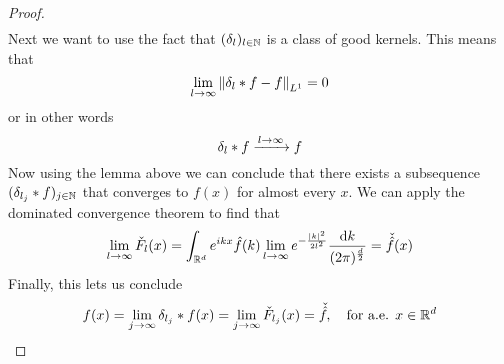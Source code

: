 \documentclass[../../script.tex]{subfiles}
\begin{document}
\begin{proof}
\begin{equation}
\begin{split}
        \end{split}
    \end{equation}
    Next we want to use the fact that $(\delta_l)_{l \in \mathbb{N}}$ is a class of good kernels. This means that 
    \begin{equation}
        \lim_{l \rightarrow \infty} \norm{\delta_l * f - f}_{L^1} = 0
    \end{equation}
    or in other words 
    \begin{equation}
        \delta_l * f \conv{l \rightarrow \infty} f
    \end{equation}
    Now using the lemma above we can conclude that there exists a subsequence $(\delta_{l_j} * f)_{j \in \mathbb{N}}$ that converges to $f(x)$ for almost every $x$.
    We can apply the dominated convergence theorem to find that 
    \begin{equation}
        \lim_{l \rightarrow \infty} \check{F}_l(x) = \int_{\mathbb{R}^d} e^{ikx} \hat{f}(k) \lim_{l \rightarrow \infty} e^{-\frac{\abs{k}^2}{2l^2}} \frac{\dd{k}}{(2\pi)^{\frac{d}{2}}} = \check{\hat{f}}(x)
    \end{equation}
    Finally, this lets us conclude 
    \begin{equation}
        f(x) = \lim_{j \rightarrow \infty} \delta_{l_j} * f(x) = \lim_{j \rightarrow \infty} \check{F}_{l_j} (x) = \check{\hat{f}}, \quad \text{for a.e. } x \in \mathbb{R}^d
    \end{equation}
\end{proof}
\end{document}
